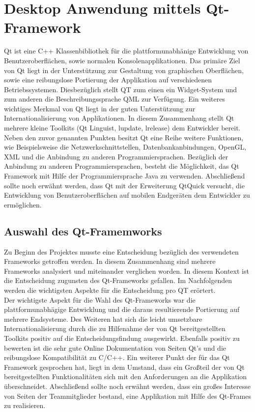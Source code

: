 \newpage
\section{Desktop Anwendung mittels Qt-Framework}

Qt ist eine C++ Klassenbibliothek für die plattformunabhänige Entwicklung von Benutzeroberflächen, sowie normalen Konsolenapplikationen. Das primäre Ziel von Qt liegt in der Unterstützung zur Gestaltung von graphischen Oberflächen, sowie eine reibungslose Portierung der Applikation auf verschiedenen Betriebssystemen. Diesbezüglich stellt QT zum einen ein Widget-System und zum anderen die Beschreibungssprache QML zur Verfügung. Ein weiteres wichtiges Merkmal von Qt liegt in der guten Unterstützung zur Internationalisierung von Applikationen. In diesem Zusammenhang stellt Qt mehrere kleine Toolkits (Qt Linguist, lupdate, lrelease) dem Entwickler bereit. Neben den zuvor genannten Punkten besitzt Qt eine Reihe weitere Funktionen, wie Beispielsweise die Netzwerkschnittstellen, Datenbankanbindungen, OpenGL, XML und die Anbindung zu anderen Programmiersprachen. Bezüglich der Anbindung zu anderen Programmiersprachen, besteht die Möglichkeit, das Qt Framework mit Hilfe der Programmiersprache Java zu verwenden. Abschließend sollte noch erwähnt werden, dass Qt mit der Erweiterung QtQuick versucht, die Entwicklung von Benutzeroberflächen auf mobilen Endgeräten dem Entwickler zu ermöglichen.

\subsection{Auswahl des Qt-Framemworks}

Zu Beginn des Projektes musste eine Entscheidung bezüglich des verwendeten Frameworks getroffen werden. In diesem Zusammenhang sind mehrere Frameworks analysiert und miteinander verglichen worden. In diesem Kontext ist die Entscheidung zugunsten des Qt-Frameworks gefallen. Im Nachfolgenden werden die wichtigsten Aspekte für die Entscheidung pro QT erörtert. \\

Der wichtigste Aspekt für die Wahl des Qt-Frameworks war die plattformunabhägige Entwicklung und die daraus resultierende Portierung auf mehrere Endsysteme. Des Weiteren hat sich die leicht umsetzbare Internationalisierung durch die zu Hilfenahme der von Qt bereitgestellten Toolkits positiv auf die Entscheidungsfindung ausgewirkt. Ebenfalls positiv zu bewerten ist die sehr gute Online Dokumentation von Seiten Qt’s und die reibungslose Kompatibilität zu C/C++. Ein weiterer Punkt der für das Qt Framework gesprochen hat, liegt in dem Umstand, dass ein Großteil der von Qt bereitgestellten Funktionalitäten sich mit den Anforderungen an die Applikation überschneidet. Abschließend sollte noch erwähnt werden, dass ein großes Interesse von Seiten der Teammitglieder bestand, eine Applikation mit Hilfe des Qt-Frames zu realisieren.

